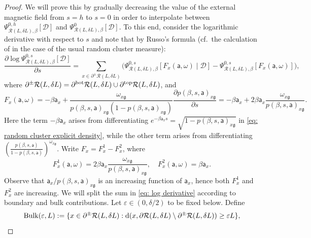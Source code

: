 \documentclass[11pt,a4paper]{article}
\renewcommand{\epsilon}{\varepsilon}
\numberwithin{equation}{section}
\theoremstyle{plain}
\theoremstyle{definition}
\newcommand\fg{\mathfrak{g}}
\begin{document}
\begin{proof}
We will prove this by gradually decreasing the value of the external magnetic field from $s=h$ to $s=0$ in order to interpolate between $\Psi^{0,h}_{\mathcal R(L,\delta L),\beta}[ \mathcal{D} ]$ and $\Psi^{0}_{\mathcal R(L,\delta L),\beta}[ \mathcal{D} ]$. To this end, consider the logarithmic derivative with respect to $s$ and note that by Russo's formula (cf.\ the calculation of \cite[Theorem~(2.43)]{Grimmett2006RCM} in the case of the usual random cluster measure):
\begin{equation} \label{eq: log derivative}
\frac{\partial \log \Psi^{0,s}_{\mathcal R(L,\delta L),\beta}[ \mathcal{D} ]}{\partial s}= \sum_{x\in \partial^{\pm}\mathcal{R}(L,\delta L)} \Big(\Psi^{0,s}_{\mathcal R(L,\delta L),\beta}\left[F_x(\mathsf{a},\omega) \mid  \mathcal{D}\right] -\Psi^{0,s}_{\mathcal R(L,\delta L),\beta}\left[F_x(\mathsf{a},\omega)\right]\Big),
\end{equation}
where $\partial^{\pm}\mathcal{R}(L,\delta L)=\partial^{\rm bot}\mathcal{R}(L,\delta L)\cup \partial^{\rm top}\mathcal{R}(L,\delta L)$, and
\begin{equation}
F_x(\mathsf{a},\omega)=-\beta \mathsf{a}_x+\frac{\omega_{x\fg}}{p(\beta,s,\mathsf{a})_{x\fg}(1-p(\beta,s,\mathsf{a})_{x\fg})} \frac{\partial p(\beta,s,\mathsf{a})_{x\fg}}{\partial s}=-\beta\mathsf{a}_x+2\beta \mathsf{a}_x\frac{\omega_{x\fg}}{p(\beta,s,\mathsf{a})_{x\fg}}.
\end{equation}
Here the term $-\beta \mathsf{a}_x$ arises from differentiating $e^{-\beta \mathsf{a}_x s}=\sqrt{1-p(\beta,s,\mathsf{a})_{x\fg}}$ in \eqref{eq: random cluster explicit density}, while the other term arises from differentiating $\left(\frac{p(\beta,s,\mathsf{a})}{1-p(\beta,s,\mathsf{a})}\right)^{\omega_{x\fg}}$. Write $F_x=F^1_x-F^2_x$, where 
\begin{equation}
F^1_x(\mathsf{a},\omega)=2\beta \mathsf{a}_x\frac{\omega_{x\fg}}{p(\beta,s,\mathsf{a})_{x\fg}}, \quad
F^2_x(\mathsf{a},\omega)=\beta \mathsf{a}_x.
\end{equation}
Observe that $\mathsf{a}_x/p(\beta,s,\mathsf{a})_{x\fg}$
is an increasing function of $\mathsf{a}_x$, hence both $F^1_x$ and $F^2_x$ are increasing.
We will split the sum in \eqref{eq: log derivative} according to boundary and bulk contributions. Let $\epsilon \in (0,\delta/2)$ to be fixed below. Define
\begin{equation}
{\rm Bulk}(\varepsilon, L):= \{ x \in \partial^{\pm}\mathcal{R}(L,\delta L): {\rm d}( x, \partial \mathcal R(L,\delta L) \setminus \partial^\pm \mathcal R(L,\delta L)) \geq \varepsilon L \},

\end{equation}
\end{proof}
\end{document}
